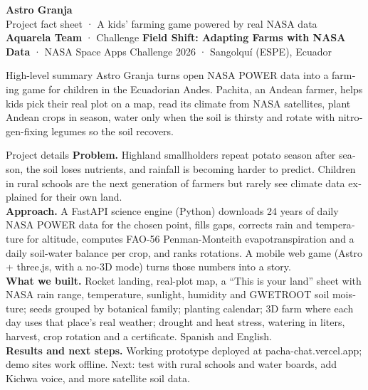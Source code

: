 \documentclass[10pt,a4paper]{article}
\newcommand{\titulo}{\bfseries}
\newcommand{\banda}[3]{%
\begin{tcolorbox}[colback=verde,colframe=oro,boxrule=0pt,bottomrule=4pt,arc=6pt,left=12pt,right=12pt,top=10pt,bottom=10pt,
  fontupper=\color{white}]
{\titulo\fontsize{26}{28}\selectfont #1}\\[2pt]
{\large #2}\\[4pt]
{\small #3}
\end{tcolorbox}}
\begin{document}
\begin{otherlanguage}{english}
\banda{Astro Granja}{Project fact sheet · A kids' farming game powered by real NASA data}%
{\textbf{Aquarela Team} · Challenge \textbf{Field Shift: Adapting Farms with NASA Data} · NASA Space Apps Challenge 2026 · Sangolquí (ESPE), Ecuador}

\begin{tarjeta}{High-level summary}
Astro Granja turns open NASA POWER data into a farming game for children in the Ecuadorian Andes. Pachita, an Andean farmer,
helps kids pick their real plot on a map, read its climate from NASA satellites, plant Andean crops in season, water only when
the soil is thirsty and rotate with nitrogen-fixing legumes so the soil recovers.
\end{tarjeta}

\begin{tarjeta}[azul]{Project details}
\small
\textbf{Problem.} Highland smallholders repeat potato season after season, the soil loses nutrients, and rainfall is becoming harder
to predict. Children in rural schools are the next generation of farmers but rarely see climate data explained for their own land.\\[2pt]
\textbf{Approach.} A FastAPI science engine (Python) downloads 24 years of daily NASA POWER data for the chosen point, fills gaps,
corrects rain and temperature for altitude, computes FAO-56 Penman-Monteith evapotranspiration and a daily soil-water balance per
crop, and ranks rotations. A mobile web game (Astro + three.js, with a no-3D mode) turns those numbers into a story.\\[2pt]
\textbf{What we built.} Rocket landing, real-plot map, a “This is your land” sheet with NASA rain range, temperature, sunlight,
humidity and GWETROOT soil moisture; seeds grouped by botanical family; planting calendar; 3D farm where each day uses that
place's real weather; drought and heat stress, watering in liters, harvest, crop rotation and a certificate. Spanish and English.\\[2pt]
\textbf{Results and next steps.} Working prototype deployed at pacha-chat.vercel.app; demo sites work offline. Next: test with
rural schools and water boards, add Kichwa voice, and more satellite soil data.
\end{tarjeta}


\end{otherlanguage}
\end{document}
